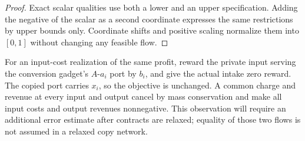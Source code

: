 \begin{proof}
Exact scalar qualities use both a lower and an upper specification.
Adding the negative of the scalar as a second coordinate expresses the
same restrictions by upper bounds only. Coordinate shifts and positive
scaling normalize them into $[0,1]$ without changing any feasible flow.
\end{proof}

For an input-cost realization of the same profit, reward the private
input serving the conversion gadget's $A$-$a_i$ port by $b_i$, and give
the actual intake zero reward. The copied port carries $x_i$, so the
objective is unchanged. A common charge and revenue at every input and
output cancel by mass conservation and make all input costs and output
revenues nonnegative. This observation will require an additional error
estimate after contracts are relaxed; equality of those two flows is
not assumed in a relaxed copy network.

